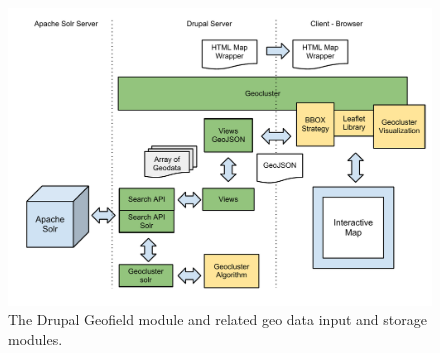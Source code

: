 \begin{figure}[h]
  \begin{center}
    \includegraphics[width=1\textwidth]{figures/geocluster_solr_architecture.pdf}
    \caption{The Drupal Geofield module and related geo data input and storage modules.}
    \label{fig:geofield}
  \end{center}
\end{figure}